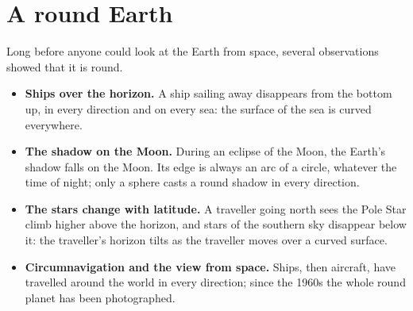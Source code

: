 \section{A round Earth}

Long before anyone could look at the Earth from space, several observations
showed that it is round.
\begin{itemize}
  \item \textbf{Ships over the horizon.} A ship sailing away disappears from
        the bottom up, in every direction and on every sea: the surface of
        the sea is curved everywhere.
  \item \textbf{The shadow on the Moon.} During an eclipse of the Moon, the
        Earth's shadow falls on the Moon. Its edge is always an arc of a
        circle, whatever the time of night; only a sphere casts a round
        shadow in every direction.
  \item \textbf{The stars change with latitude.} A traveller going north sees
        the Pole Star climb higher above the horizon, and stars of the
        southern sky disappear below it: the traveller's horizon tilts as
        the traveller moves over a curved surface.
  \item \textbf{Circumnavigation and the view from space.} Ships, then
        aircraft, have travelled around the world in every direction; since
        the 1960s the whole round planet has been photographed.
\end{itemize}


